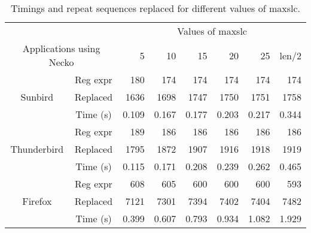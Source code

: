 
{\normalsize
\begin{table*}[t]
\begin{center}
\small
   \begin{tabular}{|c|c|r|r|r|r|r|r|}
      \hline
      \multicolumn{2}{|c|}{} & \multicolumn{6}{|c|}{Values of maxslc} \\
      \cline{3-8}
      \multicolumn{2}{|c|}{Applications using Necko}
                             & {5} & {10}  & {15} & {20} & {25} & {len/2} \\
      \hline
      \hline
      {}     & {Reg expr}  & {180}      & {174}       & {174}       & {174}      & {174}      & {174} \\
      \cline{2-8}
      {Sunbird}            & {Replaced}  & {1636}       & {1698}       & {1747}        & {1750}      & {1751}       & {1758} \\
      \cline{2-8}
      {}     & {Time (s)}  & {0.109}      & {0.167}       & {0.177}       & {0.203}      & {0.217}      & {0.344} \\
      \hline
      \hline
      {}     & {Reg expr}  & {189}      & {186}       & {186}       & {186}      & {186}      & {186} \\
      \cline{2-8}
      {Thunderbird}            & {Replaced}  & {1795}       & {1872}       & {1907}        & {1916}      & {1918}       & {1919} \\
      \cline{2-8}
      {}       & {Time (s)}  & {0.115}      & {0.171}      & {0.208}       & {0.239}     & {0.262}      & {0.465} \\
      \hline
      \hline
      {}     & {Reg expr}  & {608}      & {605}       & {600}       & {600}      & {600}      & {593} \\
      \cline{2-8}
      {Firefox}            & {Replaced}  & {7121}       & {7301}       & {7394}        & {7402}      & {7404}       & {7482} \\
      \cline{2-8}
      {}       & {Time (s)}  & {0.399}      & {0.607}      & {0.793}       & {0.934}     & {1.082}      & {1.929} \\
      \hline
   \end{tabular}
\end{center}
 \caption{Timings and repeat sequences replaced for different values 
of maxslc.
}
\label{table:slicetimes}
\shortline
\end{table*}
}

